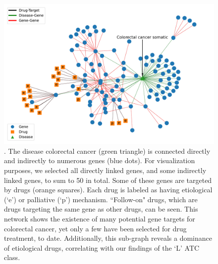 \documentclass[journal,twoside,web]{ieeecolor}
\begin{document}
\vspace{-2em}
\begin{figure}[H]
    \centering
    \includegraphics[width=\linewidth]{Figures/heterogeneous_networks.pdf}
    \caption{ . The disease colorectal cancer (green triangle) is connected directly and indirectly to numerous genes (blue dots).
    For visualization purposes, we selected all directly linked genes, and some indirectly linked genes, to sum to 50 in total.
    Some of these genes are targeted by drugs (orange squares). Each drug is labeled as having etiological (`e') or palliative (`p') mechanism.
    ``Follow-on" drugs, which are drugs targeting the same gene as other drugs, can be seen.
    This network shows the existence of many potential gene targets for colorectal cancer, yet only a few have been selected for drug treatment, to date. Additionally, this sub-graph reveals a dominance of etiological drugs, correlating with our findings of the `L’ ATC class.}
    \label{fig:heteroSubGraph}
\end{figure}


\end{document}
